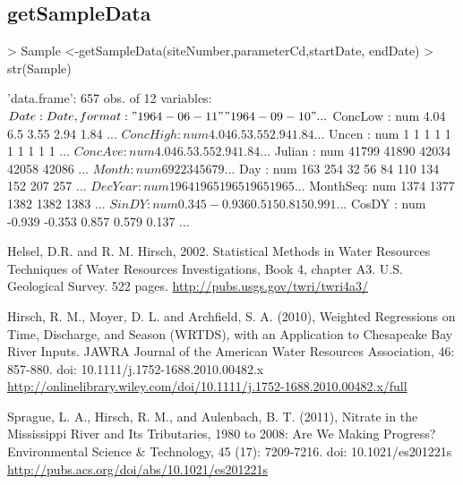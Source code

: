 \documentclass[a4paper,11pt]{article}
\begin{document}
\subsection{getSampleData}
\begin{Schunk}
\begin{Sinput}
> Sample <-getSampleData(siteNumber,parameterCd,startDate, endDate)
> str(Sample)
\end{Sinput}
\begin{Soutput}
'data.frame':	657 obs. of  12 variables:
 $ Date    : Date, format: "1964-06-11" "1964-09-10" ...
 $ ConcLow : num  4.04 6.5 3.55 2.94 1.84 ...
 $ ConcHigh: num  4.04 6.5 3.55 2.94 1.84 ...
 $ Uncen   : num  1 1 1 1 1 1 1 1 1 1 ...
 $ ConcAve : num  4.04 6.5 3.55 2.94 1.84 ...
 $ Julian  : num  41799 41890 42034 42058 42086 ...
 $ Month   : num  6 9 2 2 3 4 5 6 7 9 ...
 $ Day     : num  163 254 32 56 84 110 134 152 207 257 ...
 $ DecYear : num  1964 1965 1965 1965 1965 ...
 $ MonthSeq: num  1374 1377 1382 1382 1383 ...
 $ SinDY   : num  0.345 -0.936 0.515 0.815 0.991 ...
 $ CosDY   : num  -0.939 -0.353 0.857 0.579 0.137 ...
\end{Soutput}
\end{Schunk}


\begin{thebibliography}{10}

Helsel, D.R. and R. M. Hirsch, 2002. Statistical Methods in Water Resources Techniques of Water Resources Investigations, Book 4, chapter A3. U.S. Geological Survey. 522 pages. \url{http://pubs.usgs.gov/twri/twri4a3/}

Hirsch, R. M., Moyer, D. L. and Archfield, S. A. (2010), Weighted Regressions on Time, Discharge, and Season (WRTDS), with an Application to Chesapeake Bay River Inputs. JAWRA Journal of the American Water Resources Association, 46: 857-880. doi: 10.1111/j.1752-1688.2010.00482.x \url{http://onlinelibrary.wiley.com/doi/10.1111/j.1752-1688.2010.00482.x/full}

Sprague, L. A., Hirsch, R. M., and Aulenbach, B. T. (2011), Nitrate in the Mississippi River and Its Tributaries, 1980 to 2008: Are We Making Progress? Environmental Science \& Technology, 45 (17): 7209-7216. doi: 10.1021/es201221s \url{http://pubs.acs.org/doi/abs/10.1021/es201221s}

\end{thebibliography}
\end{document}
